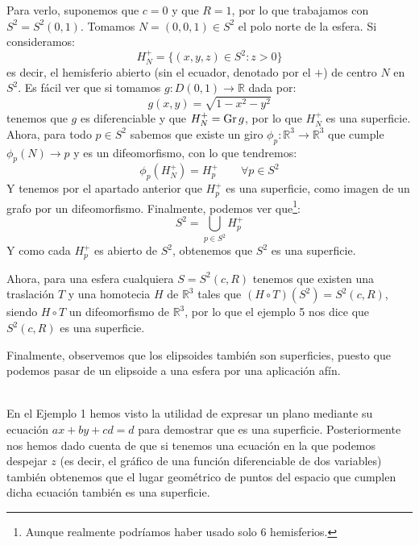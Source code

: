 \begin{ejemplo}
\begin{enumerate}
            Para verlo, suponemos que $c = 0$ y que $R = 1$, por lo que trabajamos con $S^2 = S^2(0,1)$. Tomamos $N = (0,0,1)\in S^2$ el polo norte de la esfera. Si consideramos:
            \begin{equation*}
                H_N^+ = \{(x,y,z)\in S^2 : z > 0\}
            \end{equation*}
            es decir, el hemisferio abierto (sin el ecuador, denotado por el $+$) de centro $N$ en $S^2$. Es fácil ver que si tomamos $g:D(0,1)\to \mathbb{R}$ dada por:
            \begin{equation*}
                g(x,y) = \sqrt{1-x^2-y^2}
            \end{equation*}
            tenemos que $g$ es diferenciable y que $H_N^+ = \operatorname{Gr} g$, por lo que $H_N^+$ es una superficie. Ahora, para todo $p\in S^2$ sabemos que existe un giro $\phi_p:\mathbb{R}^3\to\mathbb{R}^3$ que cumple $\phi_p(N) \to p$ y es un difeomorfismo, con lo que tendremos:
            \begin{equation*}
                \phi_p(H_N^+) = H_p^+ \qquad \forall p\in S^2
            \end{equation*}
            Y tenemos por el apartado anterior que $H_p^+$ es una superficie, como imagen de un grafo por un difeomorfismo. Finalmente, podemos ver que\footnote{Aunque realmente podríamos haber usado solo 6 hemisferios.}:
            \begin{equation*}
                S^2 = \bigcup_{p\in S^2} H_p^+
            \end{equation*}
            Y como cada $H_p^+$ es abierto de $S^2$, obtenemos que $S^2$ es una superficie.

            Ahora, para una esfera cualquiera $S=S^2(c,R)$ tenemos que existen una traslación $T$ y una homotecia $H$ de $\mathbb{R}^3$ tales que $(H\circ T)(S^2) = S^2(c,R)$, siendo $H\circ T$ un difeomorfismo de $\mathbb{R}^3$, por lo que el ejemplo 5 nos dice que $S^2(c,R)$ es una superficie.

            Finalmente, observemos que los elipsoides también son superficies, puesto que podemos pasar de un elipsoide a una esfera por una aplicación afín.
    \end{enumerate}
\end{ejemplo}~\\

\noindent
En el Ejemplo 1 hemos visto la utilidad de expresar un plano mediante su ecuación $ax + by + cd = d$ para demostrar que es una superficie. Posteriormente nos hemos dado cuenta de que si tenemos una ecuación en la que podemos despejar $z$ (es decir, el gráfico de una función diferenciable de dos variables) también obtenemos que el lugar geométrico de puntos del espacio que cumplen dicha ecuación también es una superficie. 

